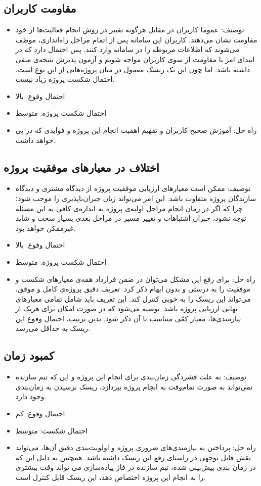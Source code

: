 \documentclass{article}
\begin{document}
\subsection{مقاومت کاربران}
\begin{itemize}
\item توصیف: عموما کاربران در مقابل هرگونه تغییر در روش انجام فعالیت‌ها از خود مقاومت نشان می‌دهند. کاربران این سامانه پس از اتمام مراحل راه‌اندازی، موظف می‌شوند که اطلاعات مربوطه را در سامانه وارد کنند. پس احتمال دارد که در ابتدای امر با مقاومت از سوی کاربران مواجه شویم و آزمون پذیرش نتیجه‌ی منفی داشته باشد. اما چون این یک ریسک معمول در میان پروژه‌هایی از این نوع است، احتمال شکست پروژه زیاد نیست.
\item احتمال وقوع: بالا
\item احتمال شکست پروژه: متوسط
\item راه حل: آموزش صحیح کاربران و تفهیم اهمیت انجام این پروژه و فوایدی که در پی خواهد داشت.
\end{itemize}

\subsection{اختلاف در معیارهای موفقیت پروژه}
\begin{itemize}
\item توصیف: ممکن است معیارهای ارزیابی موفقیت پروژه از دیدگاه مشتری و دیدگاه سازندگان پروژه متفاوت باشد. این امر می‌تواند زیان جبران‌ناپذیری را موجب شود؛ چرا که اگر در زمان انجام مراحل اولیه‌ی پروژه به اندازه‌ی کافی به این مسئله توجه نشود، جبران اشتباهات و تغییر مسیر در مراحل بعدی بسیار سخت و شاید غیرممکن خواهد بود.
\item احتمال وقوع: بالا
\item احتمال شکست پروژه: متوسط
\item راه حل: برای رفع این مشکل می‌توان در ضمن قرارداد همه‌ی معیارهای شکست و موفقیت را به درستی و بدون ابهام ذکر کرد. تعریف دقیق پروژه‌ی کامل و موفق، می‌تواند این ریسک را به خوبی کنترل کند. این تعریف باید شامل تمامی معیارهای نهایی ارزیابی پروژه باشد. توصیه می‌شود که در صورت امکان برای هریک از نیازمندی‌ها، معیار کمّی متناسب با آن ذکر شود. بدین ترتیب، احتمال وقوع این ریسک به حداقل می‌رسد.
\end{itemize}


\subsection{کمبود زمان}
\begin{itemize}
\item توصیف: به علت فشردگی زمان‌بندی برای انجام این پروژه و این که تیم سازنده نمی‌تواند به صورت تمام‌وقت به انجام پروژه بپردازد، ریسک نرسیدن به زمان‌بندی وجود دارد.
\item احتمال وقوع: کم
\item احتمال شکست: متوسط
\item راه حل: پرداختن به نیازمندی‌های ضروری پروژه و اولویت‌بندی دقیق آن‌ها، می‌تواند نقش قابل توجهی در راستای رفع این ریسک داشته باشد. همچنین به دلیل این که در زمان بندی پیش‌بینی شده، تیم سازنده در فاز پیاده‌سازی می تواند وقت بیشتری را به انجام این پروژه اختصاص دهد، این ریسک قابل کنترل است.
\end{itemize}
\end{document}
